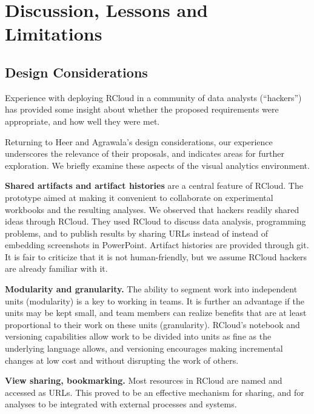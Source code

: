 \section{Discussion, Lessons and Limitations}
\label{sec:limitations}

\subsection{Design Considerations}


Experience with deploying RCloud in a community of data analysts
(``hackers'') has provided some insight about whether the proposed
requirements were appropriate, and how well they were met.

Returning to Heer and Agrawala's design considerations, our experience
underscores the relevance of their proposals, and indicates areas
for further exploration. We briefly examine these aspects of the
visual analytics environment.

{\bf Shared artifacts and artifact histories} are a central feature
of RCloud. The prototype aimed at making it convenient to collaborate
on experimental workbooks and the resulting analyses. We observed
that hackers readily shared ideas through RCloud. They used RCloud
to discuss data analysis, programming problems, and to publish results
by sharing URLs instead of instead of embedding screenshots in
PowerPoint. Artifact histories are provided through git. It is fair
to criticize that it is not human-friendly, but we assume RCloud
hackers are already familiar with it.

{\bf Modularity and granularity.} The ability to segment work into
independent units (modularity) is a key to working in teams. It is
further an advantage if the units may be kept small, and team members
can realize benefits that are at least proportional to their work
on these units (granularity). RCloud's notebook and versioning
capabilities allow work to be divided into units as fine as
the underlying language allows, and versioning encourages making
incremental changes at low cost and without disrupting the work
of others.

{\bf View sharing, bookmarking.} Most resources in RCloud are named
and accessed as URLs. This proved to be an effective mechanism for
sharing, and for analyses to be integrated with external processes
and systems.

